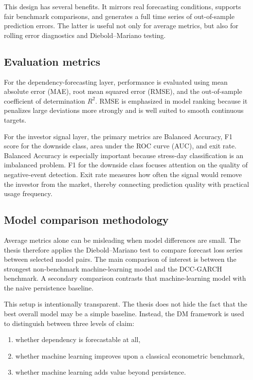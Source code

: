 This design has several benefits. It mirrors real forecasting conditions, supports fair benchmark comparisons, and generates a full time series of out-of-sample prediction errors. The latter is useful not only for average metrics, but also for rolling error diagnostics and Diebold--Mariano testing.

\subsection{Evaluation metrics}

For the dependency-forecasting layer, performance is evaluated using mean absolute error (MAE), root mean squared error (RMSE), and the out-of-sample coefficient of determination $R^2$. RMSE is emphasized in model ranking because it penalizes large deviations more strongly and is well suited to smooth continuous targets.

For the investor signal layer, the primary metrics are Balanced Accuracy, F1 score for the downside class, area under the ROC curve (AUC), and exit rate. Balanced Accuracy is especially important because stress-day classification is an imbalanced problem. F1 for the downside class focuses attention on the quality of negative-event detection. Exit rate measures how often the signal would remove the investor from the market, thereby connecting prediction quality with practical usage frequency.

\subsection{Model comparison methodology}

Average metrics alone can be misleading when model differences are small. The thesis therefore applies the Diebold--Mariano test to compare forecast loss series between selected model pairs. The main comparison of interest is between the strongest non-benchmark machine-learning model and the DCC-GARCH benchmark. A secondary comparison contrasts that machine-learning model with the naive persistence baseline.

This setup is intentionally transparent. The thesis does not hide the fact that the best overall model may be a simple baseline. Instead, the DM framework is used to distinguish between three levels of claim:

\begin{enumerate}
    \item whether dependency is forecastable at all,
    \item whether machine learning improves upon a classical econometric benchmark,
    \item whether machine learning adds value beyond persistence.
\end{enumerate}

